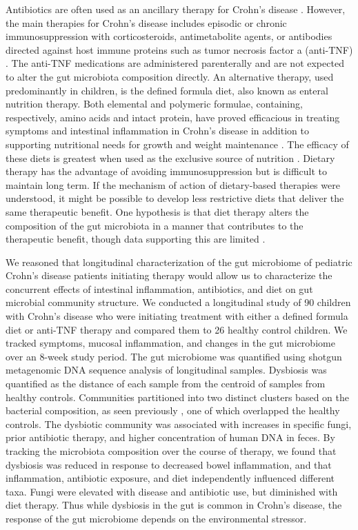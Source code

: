 Antibiotics are often used as an ancillary therapy for Crohn's disease \citep{Khan:2011vo}. However, the main therapies for Crohn's disease includes episodic or chronic immunosuppression with corticosteroids, antimetabolite agents, or antibodies directed against host immune proteins such as tumor necrosis factor a (anti-TNF) \citep{Borrelli:2006tk, Grover:2013dj, Rutgeerts:2012ul}. The anti-TNF medications are administered parenterally and are not expected to alter the gut microbiota composition directly. An alternative therapy, used predominantly in children, is the defined formula diet, also known as enteral nutrition therapy. Both elemental and polymeric formulae, containing, respectively, amino acids and intact protein, have proved efficacious in treating symptoms and intestinal inflammation in Crohn's disease in addition to supporting nutritional needs for growth and weight maintenance \citep{Borrelli:2006tk,Grover:2013dj}. The efficacy of these diets is greatest when used as the exclusive source of nutrition \citep{Grover:2013dj,lee2015comparative}. Dietary therapy has the advantage of avoiding immunosuppression but is difficult to maintain long term. If the mechanism of action of dietary-based therapies were understood, it might be possible to develop less restrictive diets that deliver the same therapeutic benefit. One hypothesis is that diet therapy alters the composition of the gut microbiota in a manner that contributes to the therapeutic benefit, though data supporting this are limited \citep{Gerasimidis:2014gi,Kaakoush:2015hh}.


We reasoned that longitudinal characterization of the gut microbiome of pediatric Crohn's disease patients initiating therapy would allow us to characterize the concurrent effects of intestinal inflammation, antibiotics, and diet on gut microbial community structure. We conducted a longitudinal study of 90 children with Crohn's disease who were initiating treatment with either a defined formula diet or anti-TNF therapy and compared them to 26 healthy control children. We tracked symptoms, mucosal inflammation, and changes in the gut microbiome over an 8-week study period. The gut microbiome was quantified using shotgun metagenomic DNA sequence analysis of longitudinal samples. Dysbiosis was quantified as the distance of each sample from the centroid of samples from healthy controls. Communities partitioned into two distinct clusters based on the bacterial composition, as seen previously \citep{Frank:2007hn, gevers2014treatment}, one of which overlapped the healthy controls. The dysbiotic community was associated with increases in specific fungi, prior antibiotic therapy, and higher concentration of human DNA in feces. By tracking the microbiota composition over the course of therapy, we found that dysbiosis was reduced in response to decreased bowel inflammation, and that inflammation, antibiotic exposure, and diet independently influenced different taxa. Fungi were elevated with disease and antibiotic use, but diminished with diet therapy. Thus while dysbiosis in the gut is common in Crohn's disease, the response of the gut microbiome depends on the environmental stressor.


